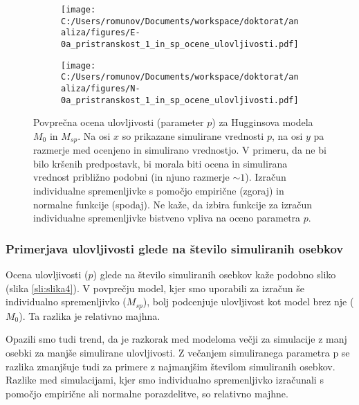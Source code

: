 \begin{figure}[H]
\centering
\begin{subfigure}[b]{0.75\textwidth}
  \centering
  \texttt{[image: C:/Users/romunov/Documents/workspace/doktorat/analiza/figures/E-0a\_pristranskost\_1\_in\_sp\_ocene\_ulovljivosti.pdf]}
  \label{sli:sub3.1}
\end{subfigure}

\begin{subfigure}[b]{0.75\textwidth}
  \centering
  \texttt{[image: C:/Users/romunov/Documents/workspace/doktorat/analiza/figures/N-0a\_pristranskost\_1\_in\_sp\_ocene\_ulovljivosti.pdf]}
  \label{sli:sub3.2}
\end{subfigure}

\caption[Primerjava ocenjene ulovljivosti s simulirano]{Povprečna ocena ulovljivosti (parameter $p$) za Hugginsova modela $M_0$ in $M_{sp}$. Na osi $x$ so prikazane simulirane vrednosti $p$, na osi $y$ pa razmerje med ocenjeno in simulirano vrednostjo. V primeru, da ne bi bilo kršenih predpostavk, bi morala biti ocena in simulirana vrednost približno podobni (in njuno razmerje $\sim 1$). Izračun individualne spremenljivke s pomočjo empirične (zgoraj) in normalne funkcije (spodaj). Ne kaže, da izbira funkcije za izračun individualne spremenljivke bistveno vpliva na oceno parametra $p$.}
\label{sli:slika3}
\end{figure}

\subsubsection{Primerjava ulovljivosti glede na število simuliranih osebkov}
Ocena ulovljivosti ($p$) glede na število simuliranih osebkov kaže podobno sliko (slika \ref{sli:slika4}). V povprečju model, kjer smo uporabili za izračun še individualno spremenljivko ($M_{sp}$), bolj podcenjuje ulovljivost kot model brez nje ($M_0$). Ta razlika je relativno majhna.

Opazili smo tudi trend, da je razkorak med modeloma večji za simulacije z manj osebki za manjše simulirane ulovljivosti. Z večanjem simuliranega parametra p se razlika zmanjšuje tudi za primere z najmanjšim številom simuliranih osebkov. Razlike med simulacijami, kjer smo individualno spremenljivko izračunali s pomočjo empirične ali normalne porazdelitve, so relativno majhne.

